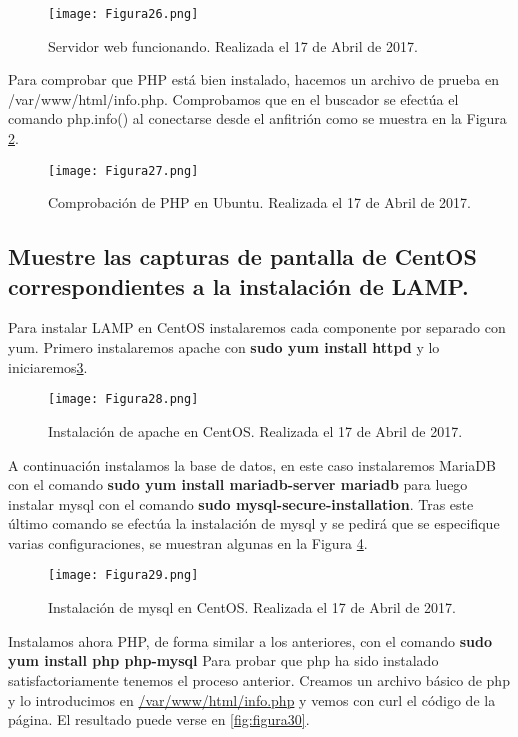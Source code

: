 \begin{figure}[H] 
\centering
\texttt{[image: Figura26.png]}  
\caption{Servidor web funcionando. Realizada el 17 de Abril de 2017.} \label{fig:figura26}
\end{figure}

Para comprobar que PHP está bien instalado, hacemos un archivo de prueba en /var/www/html/info.php. Comprobamos que en el buscador se efectúa el comando
php.info() al conectarse desde el anfitrión como se muestra en la Figura \ref{fig:figura27}.

\begin{figure}[H] 
\centering
\texttt{[image: Figura27.png]}  
\caption{Comprobación de PHP en Ubuntu. Realizada el 17 de Abril de 2017.} \label{fig:figura27}
\end{figure}

\subsection{Muestre las capturas de pantalla de CentOS correspondientes a la instalación de LAMP.}

Para instalar LAMP en CentOS instalaremos cada componente por separado\cite{lampcentos} con yum. Primero instalaremos apache con \textbf{sudo yum install httpd} y lo iniciaremos\ref{fig:figura28}.

\begin{figure}[H] 
\centering
\texttt{[image: Figura28.png]}  
\caption{Instalación de apache en CentOS. Realizada el 17 de Abril de 2017.} \label{fig:figura28}
\end{figure}

A continuación instalamos la base de datos, en este caso instalaremos MariaDB con el comando \textbf{sudo yum install mariadb-server mariadb} para luego instalar
mysql con el comando \textbf{sudo mysql-secure-installation}. Tras este último comando se efectúa la instalación de mysql y se pedirá que se especifique varias configuraciones, se muestran algunas en la Figura \ref{fig:figura29}.

\begin{figure}[H] 
\centering
\texttt{[image: Figura29.png]}  
\caption{Instalación de mysql en CentOS. Realizada el 17 de Abril de 2017.} \label{fig:figura29}
\end{figure}

Instalamos ahora PHP, de forma similar a los anteriores, con el comando \textbf{sudo yum install php php-mysql} Para probar que php ha sido instalado satisfactoriamente
tenemos el proceso anterior. Creamos un archivo básico de php y lo introducimos en \url{/var/www/html/info.php} y vemos con curl el código de la página. El 
resultado puede verse en \ref{fig:figura30}.

